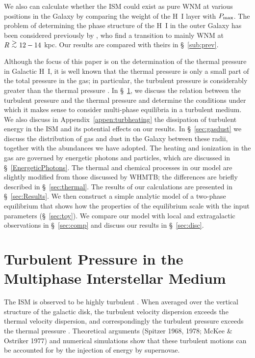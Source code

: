 \documentclass[12pt,preprint,flushrt]{aastex}
\newcommand{\pmax}{P_{\rm max}}
\newcommand{\ag}{\mbox{ \raisebox{-.4ex}{$\stackrel{\textstyle >}{\sim}$} }}
\begin{document}
We also can calculate whether the ISM could exist as
pure WNM at various positions in the Galaxy
by comparing the weight of the H~I layer with $\pmax$.
The problem of determining the phase structure of the
H~I in the outer Galaxy has been considered previously by
\cite{elm94}, who find a transition to mainly WNM at $R\ag 12-14$
kpc. Our results are compared with theirs in \S~\ref{sub:prev}.

Although the focus of this paper is on the determination
of the thermal pressure in Galactic H~I, it is
well known that the thermal pressure is only a small
part of the total pressure in the gas; in particular,
the turbulent pressure is considerably greater than
the thermal pressure \citep{bou90}.  In \S~\ref{sec:tur}, we discuss
the relation between the turbulent pressure and the
thermal pressure and determine the conditions under
which it makes sense to consider multi-phase equilibria
in a turbulent medium.  We also discuss in Appendix~\ref{appen:turbheating}
the dissipation of turbulent energy in the ISM and its potential 
effects on  our results.
In \S~\ref{sec:gasdust}
we discuss the distribution of gas and dust
in the Galaxy between these radii,
together with the abundances we have adopted.  The heating
and ionization in the gas are governed by energetic
photons and particles, which are discussed in 
\S~\ref{EnergeticPhotons}. The thermal and
chemical processes in our model are slightly modified from those
discussed by WHMTB; the differences are briefly described
in \S~\ref{sec:thermal}.
The results of our calculations are presented in \S~\ref{sec:Results}.
We then construct a simple analytic
model of a two-phase equilibrium that shows how the
properties of the equilibrium scale with the input parameters
(\S~\ref{sec:toy}).
We compare our model with local and extragalactic observations in
\S~\ref{sec:comp} and
discuss our results in \S~\ref{sec:disc}.

\section{Turbulent Pressure in the Multiphase Interstellar Medium}
\label{sec:tur}

        The ISM is observed to be highly turbulent \citep{lar79}.
When averaged over the vertical structure of the galactic disk,
the turbulent velocity dispersion exceeds the thermal
velocity dispersion, and correspondingly the
turbulent pressure exceeds the thermal pressure \citep{bou90}.
Theoretical arguments 
(Spitzer 1968, 1978; McKee \& Ostriker 1977) 
and numerical simulations
\citep{bre99,kor99} show that these turbulent motions
can be accounted for by the injection of energy by supernovae.
\end{document}
